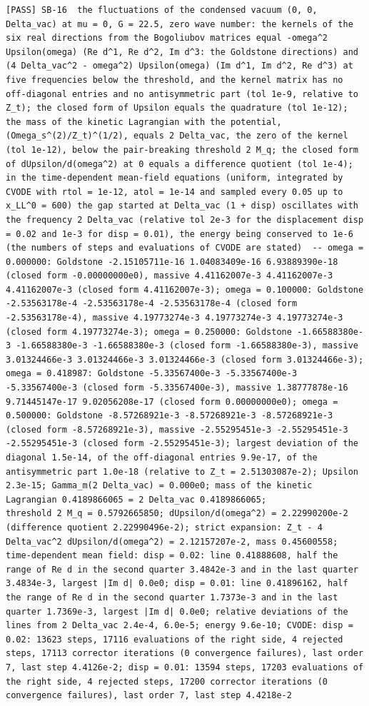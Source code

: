 \documentclass[
  10pt,
]{article}
\begin{document}
\begin{verbatim}
[PASS] SB-16  the fluctuations of the condensed vacuum (0, 0, Delta_vac) at mu = 0, G = 22.5, zero wave number: the kernels of the six real directions from the Bogoliubov matrices equal -omega^2 Upsilon(omega) (Re d^1, Re d^2, Im d^3: the Goldstone directions) and (4 Delta_vac^2 - omega^2) Upsilon(omega) (Im d^1, Im d^2, Re d^3) at five frequencies below the threshold, and the kernel matrix has no off-diagonal entries and no antisymmetric part (tol 1e-9, relative to Z_t); the closed form of Upsilon equals the quadrature (tol 1e-12); the mass of the kinetic Lagrangian with the potential, (Omega_s^(2)/Z_t)^(1/2), equals 2 Delta_vac, the zero of the kernel (tol 1e-12), below the pair-breaking threshold 2 M_q; the closed form of dUpsilon/d(omega^2) at 0 equals a difference quotient (tol 1e-4); in the time-dependent mean-field equations (uniform, integrated by CVODE with rtol = 1e-12, atol = 1e-14 and sampled every 0.05 up to x_LL^0 = 600) the gap started at Delta_vac (1 + disp) oscillates with the frequency 2 Delta_vac (relative tol 2e-3 for the displacement disp = 0.02 and 1e-3 for disp = 0.01), the energy being conserved to 1e-6 (the numbers of steps and evaluations of CVODE are stated)  -- omega = 0.000000: Goldstone -2.15105711e-16 1.04083409e-16 6.93889390e-18 (closed form -0.00000000e0), massive 4.41162007e-3 4.41162007e-3 4.41162007e-3 (closed form 4.41162007e-3); omega = 0.100000: Goldstone -2.53563178e-4 -2.53563178e-4 -2.53563178e-4 (closed form -2.53563178e-4), massive 4.19773274e-3 4.19773274e-3 4.19773274e-3 (closed form 4.19773274e-3); omega = 0.250000: Goldstone -1.66588380e-3 -1.66588380e-3 -1.66588380e-3 (closed form -1.66588380e-3), massive 3.01324466e-3 3.01324466e-3 3.01324466e-3 (closed form 3.01324466e-3); omega = 0.418987: Goldstone -5.33567400e-3 -5.33567400e-3 -5.33567400e-3 (closed form -5.33567400e-3), massive 1.38777878e-16 9.71445147e-17 9.02056208e-17 (closed form 0.00000000e0); omega = 0.500000: Goldstone -8.57268921e-3 -8.57268921e-3 -8.57268921e-3 (closed form -8.57268921e-3), massive -2.55295451e-3 -2.55295451e-3 -2.55295451e-3 (closed form -2.55295451e-3); largest deviation of the diagonal 1.5e-14, of the off-diagonal entries 9.9e-17, of the antisymmetric part 1.0e-18 (relative to Z_t = 2.51303087e-2); Upsilon 2.3e-15; Gamma_m(2 Delta_vac) = 0.000e0; mass of the kinetic Lagrangian 0.4189866065 = 2 Delta_vac 0.4189866065;
threshold 2 M_q = 0.5792665850; dUpsilon/d(omega^2) = 2.22990200e-2 (difference quotient 2.22990496e-2); strict expansion: Z_t - 4 Delta_vac^2 dUpsilon/d(omega^2) = 2.12157207e-2, mass 0.45600558; time-dependent mean field: disp = 0.02: line 0.41888608, half the range of Re d in the second quarter 3.4842e-3 and in the last quarter 3.4834e-3, largest |Im d| 0.0e0; disp = 0.01: line 0.41896162, half the range of Re d in the second quarter 1.7373e-3 and in the last quarter 1.7369e-3, largest |Im d| 0.0e0; relative deviations of the lines from 2 Delta_vac 2.4e-4, 6.0e-5; energy 9.6e-10; CVODE: disp = 0.02: 13623 steps, 17116 evaluations of the right side, 4 rejected steps, 17113 corrector iterations (0 convergence failures), last order 7, last step 4.4126e-2; disp = 0.01: 13594 steps, 17203 evaluations of the right side, 4 rejected steps, 17200 corrector iterations (0 convergence failures), last order 7, last step 4.4218e-2

\end{verbatim}
\end{document}
